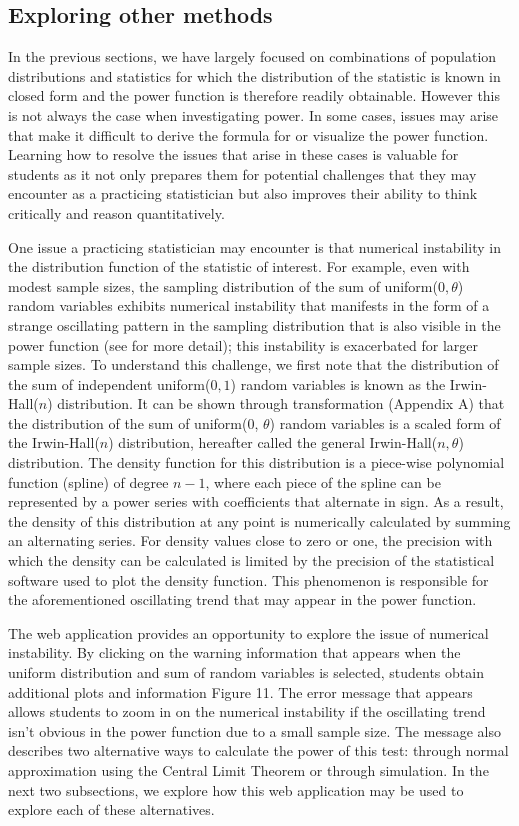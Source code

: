 \documentclass{TISE}
\begin{document}
\subsection{Exploring other methods}

In the previous sections, we have largely focused on combinations of population distributions and statistics for which the distribution of the statistic is known in closed form and the power function is therefore readily obtainable. However this is not always the case when investigating power. In some cases, issues may arise that make it difficult to derive the formula for or visualize the power function. Learning how to resolve the issues that arise in these cases is valuable for students as it not only prepares them for potential challenges that they may encounter as a practicing statistician but also improves their ability to think critically and reason quantitatively. 

One issue a practicing statistician may encounter is that numerical instability in the distribution function of the statistic of interest. For example, even with modest sample sizes, the sampling distribution of the sum of uniform($0, \theta$) random variables exhibits numerical instability that manifests in the form of a strange oscillating pattern in the sampling distribution that is also visible in the power function (see \citealt{alberto2019} for more detail); this instability is exacerbated for larger sample sizes.  To understand this challenge, we first note that the distribution of the sum of independent uniform($0,1$) random variables is known as the Irwin-Hall($n$) distribution. It can be shown through transformation (Appendix A) that the distribution of the sum of uniform(0, $\theta$) random variables is a scaled form of the Irwin-Hall($n$) distribution, hereafter called the general Irwin-Hall($n, \theta$) distribution. The density function for this distribution is a piece-wise polynomial function (spline) of degree $n - 1$, where each piece of the spline can be represented by a power series with coefficients that alternate in sign. As a result, the density of this distribution at any point is numerically calculated by summing an alternating series. For density values close to zero or one, the precision with which the density can be calculated is limited by the precision of the statistical software used to plot the density function. This phenomenon is responsible for the aforementioned oscillating trend that may appear in the power function. 

The web application provides an opportunity to explore the issue of numerical instability. By clicking on the warning information that appears when the uniform distribution and sum of random variables is selected, students obtain additional plots and information {Figure 11}. The error message that appears allows students to zoom in on the numerical instability if the oscillating trend isn't obvious in the power function due to a small sample size. The message also describes two alternative ways to calculate the power of this test: through normal approximation using the Central Limit Theorem or through simulation. In the next two subsections, we explore how this web application may be used to explore each of these alternatives.
\end{document}
